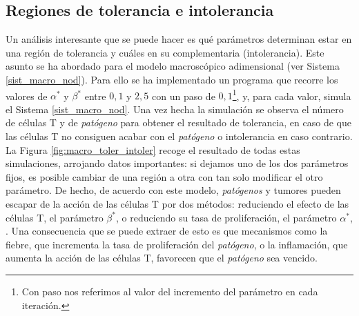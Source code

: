 


\subsection{Regiones de tolerancia e intolerancia}

Un análisis interesante que se puede hacer es qué parámetros determinan estar en una región de tolerancia y cuáles en su complementaria (intolerancia). Este asunto se ha abordado para el modelo macroscópico adimensional (ver Sistema \ref{sist_macro_nod}). Para ello se ha implementado un programa que recorre los valores de $\alpha^{*}$ y $\beta^{*}$ entre $0,1$ y $2,5$ con un paso de $0,1$\footnote{Con paso nos referimos al valor del incremento del parámetro en cada iteración.}, y, para cada valor, simula el Sistema \ref{sist_macro_nod}. Una vez hecha la simulación se observa el número de células T y de \textit{patógeno} para obtener el resultado de tolerancia, en caso de que las células T no consiguen acabar con el \textit{patógeno} o intolerancia en caso contrario. La Figura \ref{fig:macro_toler_intoler} recoge el resultado de todas estas simulaciones, arrojando datos importantes: si dejamos uno de los dos parámetros fijos, es posible cambiar de una región a otra con tan solo modificar el otro parámetro. De hecho, de acuerdo con este modelo, \textit{patógenos} y tumores pueden escapar de la acción de las células T por dos métodos: reduciendo el efecto de las células T, el parámetro $\beta^{*}$, o reduciendo su tasa de proliferación, el parámetro $\alpha^{*}$, \citep{arias2016emergent}. Una consecuencia que se puede extraer de esto es que mecanismos como la fiebre, que incrementa la tasa de proliferación del \textit{patógeno}, o la inflamación, que aumenta la acción de las células T, favorecen que el \textit{patógeno} sea vencido. 

